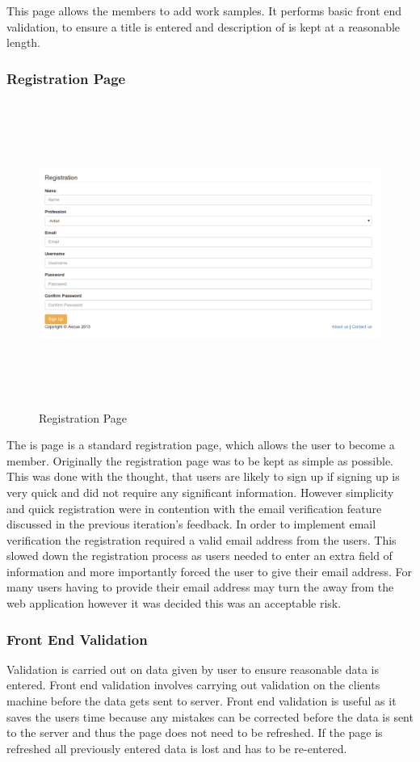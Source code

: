 \documentclass[a4paper,oneside,11pt]{report}
\begin{document}
This page allows the members to add work samples. It performs basic front end validation, to ensure a title is entered and description of is kept at a reasonable length.
\pagebreak

\subsubsection{Registration Page}
\begin{figure}[!ht]
\centering
\includegraphics[width=\textwidth,height=10cm,keepaspectratio]{registration-second-iteration.png}
\caption{Registration Page}
\end{figure}

The is page is a standard registration page, which allows the user to become a member. Originally the registration page was to be kept as simple as possible. This was done with the thought, that users are likely to sign up if signing up is very quick and did not require any significant information. However simplicity and quick registration were in contention with the email verification feature discussed in the previous iteration's feedback. In order to implement email verification the registration required a valid email address from the users. This slowed down the registration process as users needed to enter an extra field of information and more importantly forced the user to give their email address. For many users having to provide their email address may turn the away from the web application however it was decided this was an acceptable risk.
\pagebreak
\subsubsection{Front End Validation}
Validation is carried out on data given by user to ensure reasonable data is entered. Front end validation involves carrying out validation on the clients machine before the data gets sent to server. Front end validation is useful as it saves the users time because any mistakes can be corrected before the data is sent to the server and thus the page does not need to be refreshed. If the page is refreshed all previously entered data is lost and has to be re-entered.
\end{document}
